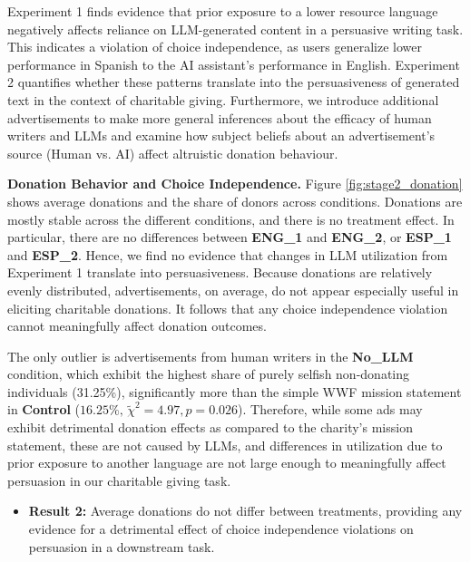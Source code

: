 Experiment 1 finds evidence that prior exposure to a lower resource language negatively affects reliance on LLM-generated content in a persuasive writing task. This indicates a violation of choice independence, as users generalize lower performance in Spanish to the AI assistant's performance in English. Experiment 2 quantifies whether these patterns translate into the persuasiveness of generated text in the context of charitable giving. Furthermore, we introduce additional advertisements to make more general inferences about the efficacy of human writers and LLMs and examine how subject beliefs about an advertisement's source (Human vs. AI) affect altruistic donation behaviour. 

\textbf{Donation Behavior and Choice Independence.} Figure \ref{fig:stage2_donation} shows average donations and the share of donors across conditions.  Donations are mostly stable across the different conditions, and there is no treatment effect. In particular, there are no differences between \textbf{ENG\_1} and \textbf{ENG\_2}, or \textbf{ESP\_1} and \textbf{ESP\_2}. Hence, we find no evidence that changes in LLM utilization from Experiment 1 translate into persuasiveness. Because donations are relatively evenly distributed, advertisements, on average, do not appear especially useful in eliciting charitable donations. It follows that any choice independence violation cannot meaningfully affect donation outcomes. 

The only outlier is advertisements from human writers in the \textbf{No\_LLM} condition, which exhibit the highest share of purely selfish non-donating individuals (31.25\%), significantly more than the simple WWF mission statement in \textbf{Control} ($16.25\%, \, \tilde{\chi}^2 = 4.97, p = 0.026$). Therefore, while some ads may exhibit detrimental donation effects as compared to the charity's mission statement, these are not caused by LLMs, and differences in utilization due to prior exposure to another language are not large enough to meaningfully affect persuasion in our charitable giving task. 



\begin{itemize}
    \item [] \textbf{Result 2:} Average donations do not differ between treatments, providing any evidence for a detrimental effect of choice independence violations on persuasion in a downstream task.
\end{itemize}



